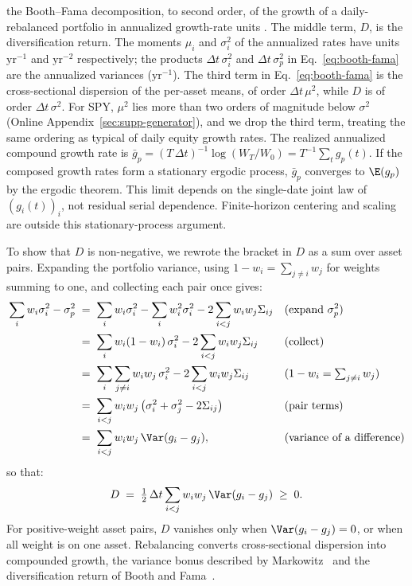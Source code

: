 the Booth--Fama decomposition, to second order, of the growth of a
daily-rebalanced portfolio in annualized growth-rate units
\cite{boothFama1992, markowitz1976longRun}. The middle term, $D$, is the diversification return. The
moments $\mu_i$ and $\sigma_i^2$ of the annualized rates
have units $\mathrm{yr}^{-1}$ and $\mathrm{yr}^{-2}$ respectively;
the products $\Delta t\,\sigma_i^2$ and $\Delta t\,\sigma_p^2$ in
Eq.~\eqref{eq:booth-fama} are the annualized variances
($\mathrm{yr}^{-1}$). The third term in Eq.~\eqref{eq:booth-fama} is
the cross-sectional dispersion of the per-asset means, of order
$\Delta t\,\mu^2$, while $D$ is of order $\Delta t\,\sigma^2$. For
SPY, $\mu^2$ lies more than two orders of magnitude below $\sigma^2$
(Online Appendix~\ref{sec:supp-generator}), and we drop the third term,
treating the same ordering as typical of daily equity growth rates.
The realized annualized compound growth rate is
$\bar g_p = (T\,\Delta t)^{-1}\log(W_T/W_0) = T^{-1}\sum_{t} g_p(t)$.
If the composed growth rates form a stationary ergodic process,
$\bar g_p$ converges to $\E(g_p)$ by the ergodic theorem. This limit depends on the single-date joint law of $(g_i(t))_i$, not residual serial dependence. Finite-horizon centering and scaling are outside this stationary-process argument.

To show that $D$ is non-negative, we rewrote the bracket in $D$ as a
sum over asset pairs. Expanding the portfolio variance, using
$1 - w_i = \sum_{j \ne i} w_j$ for weights summing to one, and
collecting each pair once gives:
\begin{align}
  \sum_i w_i \sigma_i^2 - \sigma_p^2
   &\;=\; \sum_i w_i \sigma_i^2 - \sum_i w_i^2 \sigma_i^2
     - 2 \sum_{i<j} w_i w_j \Sigma_{ij}
     && \text{(expand $\sigma_p^2$)} \notag \\
   &\;=\; \sum_i w_i (1 - w_i)\, \sigma_i^2
     - 2 \sum_{i<j} w_i w_j \Sigma_{ij}
     && \text{(collect)} \notag \\
   &\;=\; \sum_i \sum_{j \ne i} w_i w_j\, \sigma_i^2
     - 2 \sum_{i<j} w_i w_j \Sigma_{ij}
     && \text{($1 - w_i = \textstyle\sum_{j \ne i} w_j$)} \notag \\
   &\;=\; \sum_{i<j} w_i w_j
     \left(\sigma_i^2 + \sigma_j^2 - 2\Sigma_{ij}\right)
     && \text{(pair terms)} \notag \\
   &\;=\; \sum_{i<j} w_i w_j \,\Var(g_i - g_j),
     && \text{(variance of a difference)}
  \label{eq:pair-identity}
\end{align}
so that:
\begin{equation}
  D \;=\; \tfrac{1}{2}\,\Delta t \sum_{i<j} w_i w_j \,\Var(g_i - g_j)
  \;\ge\; 0.
  \label{eq:dr-pairwise}
\end{equation}
For positive-weight asset pairs, $D$ vanishes only when $\Var(g_i-g_j)=0$, or when all weight is on one asset. Rebalancing converts cross-sectional dispersion into compounded growth, the variance bonus described by Markowitz~\cite{markowitz1976longRun} and the diversification return of Booth and Fama~\cite{boothFama1992}.

